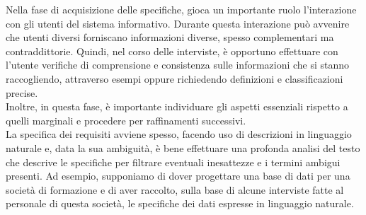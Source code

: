 \documentclass[12pt]{report}
\begin{document}
 	Nella fase di acquisizione delle specifiche, gioca un importante ruolo l'interazione con gli utenti del sistema informativo. Durante questa interazione può avvenire che utenti diversi forniscano informazioni diverse, spesso complementari ma contraddittorie. Quindi, nel corso delle interviste, è opportuno effettuare con l'utente verifiche di comprensione e consistenza sulle informazioni che si stanno raccogliendo, attraverso esempi oppure richiedendo definizioni e classificazioni precise. \\
 	Inoltre, in questa fase, è importante individuare gli aspetti essenziali rispetto a quelli marginali e procedere per raffinamenti successivi. \\
 	La specifica dei requisiti avviene spesso, facendo uso di descrizioni in linguaggio naturale e, data la sua ambiguità, è bene effettuare una profonda analisi del testo che descrive le specifiche per filtrare eventuali inesattezze e i termini ambigui presenti.
 	Ad esempio, supponiamo di dover progettare una base di dati per una società di formazione e di aver raccolto, sulla base di alcune interviste fatte al personale di questa società, le specifiche dei dati espresse in linguaggio naturale.
\end{document}
